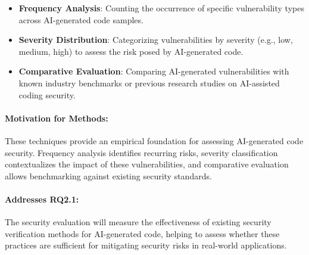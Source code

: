 \begin{itemize}
    \item \textbf{Frequency Analysis}: Counting the occurrence of specific vulnerability types across AI-generated code samples.
    \item \textbf{Severity Distribution}: Categorizing vulnerabilities by severity (e.g., low, medium, high) to assess the risk posed by AI-generated code.
    \item \textbf{Comparative Evaluation}: Comparing AI-generated vulnerabilities with known industry benchmarks or previous research studies on AI-assisted coding security.
\end{itemize}

\paragraph{Motivation for Methods:} These techniques provide an empirical foundation for assessing AI-generated code security. Frequency analysis identifies recurring risks, severity classification contextualizes the impact of these vulnerabilities, and comparative evaluation allows benchmarking against existing security standards.

\paragraph{Addresses RQ2.1:} The security evaluation will measure the effectiveness of existing security verification methods for AI-generated code, helping to assess whether these practices are sufficient for mitigating security risks in real-world applications.

